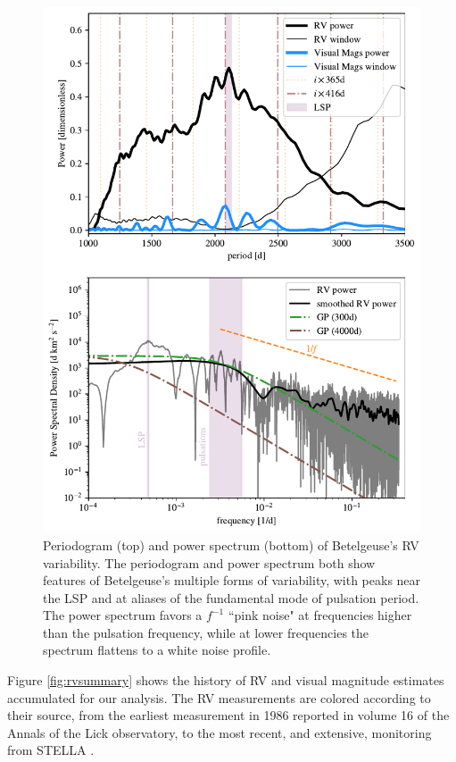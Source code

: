 \documentclass[twocolumn]{aastex631}
\begin{document}
\begin{figure}
    \centering
    \includegraphics[width=\linewidth]{figures/power_spec.pdf}
    \caption{Periodogram (top) and power spectrum (bottom) of Betelgeuse's RV variability. The periodogram and power spectrum both show features of Betelgeuse's multiple forms of variability, with peaks near the LSP and at aliases of the fundamental mode of pulsation period. The power spectrum favors a $f^{-1}$ ``pink noise" at frequencies higher than the pulsation frequency, while at lower frequencies the spectrum flattens to a white noise profile.   }
    \label{fig:periodogram}
\end{figure}

Figure \ref{fig:rvsummary} shows the history of RV and visual magnitude estimates accumulated for our analysis. The RV measurements are colored according to their source, from the earliest measurement in 1986 reported in volume 16 of the Annals of the Lick observatory, to the most recent, and extensive, monitoring from STELLA \citep{2022csss.confE.185G}. 
\end{document}
